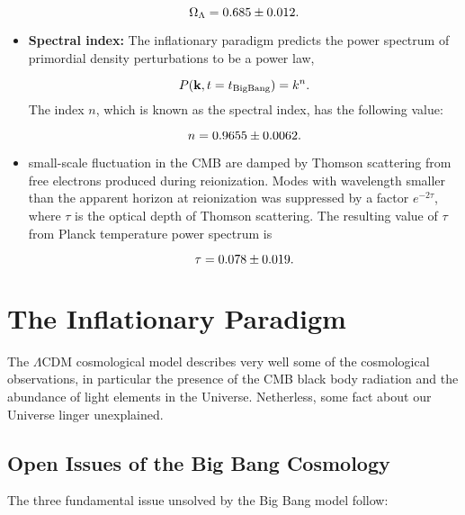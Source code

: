 \begin{itemize}
        \begin{equation}
                \Omega_\Lambda = \num{0.685 \pm 0.012}.
        \end{equation}

        \item \textbf{Spectral index:} The inflationary paradigm predicts
        the power spectrum of primordial density perturbations to be a
        power law,

        \begin{equation}
                P\qty(\vb{k},t = t_\text{BigBang}) = k^n.
        \end{equation}
        The index $n$, which is known as the spectral index, has the
        following value:

        \begin{equation}
                n = \num{0.9655 \pm 0.0062}.
        \end{equation}

        \item small-scale fluctuation in the CMB are damped by Thomson
        scattering from free electrons produced during reionization. Modes
        with wavelength smaller than the apparent horizon at reionization
        was suppressed by a factor $e^{-2\tau}$, where $\tau$ is the optical
        depth of Thomson scattering. The resulting value of $\tau$ from Planck
        temperature power spectrum is

        \begin{equation}
                \tau = \num{0.078 \pm 0.019}.
        \end{equation}
\end{itemize}

\section{The Inflationary Paradigm}

The $\Lambda$CDM cosmological model describes very well some of the
cosmological observations, in particular the presence of the CMB black
body radiation and the abundance of light elements in the Universe.
Netherless, some fact about our Universe linger unexplained.

\subsection{Open Issues of the Big Bang Cosmology}\label{ss:issues}

The three fundamental issue unsolved by the Big Bang model follow:

